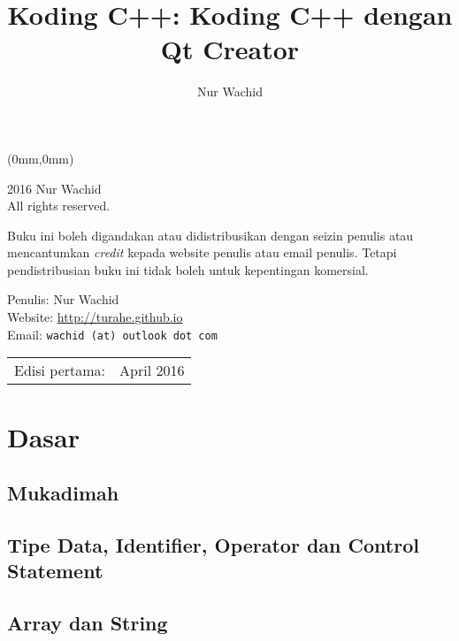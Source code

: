 \documentclass[11pt,b5paper,oneside,titlepage]{book}
\makeatletter
\renewcommand{\cleardoublepage}{
	\clearpage\ifodd\c@page\else
	\hbox{}
	\vspace*{\fill}
	\thispagestyle{empty}
	\newpage
	\fi}
\makeatother
\begin{document}
	\begin{textblock*}{297mm}(0mm,0mm)
	\end{textblock*}
	\cleardoublepage
	\frontmatter
	\author{Nur Wachid}
	\title{Koding C++: Koding C++ dengan Qt Creator}
	\maketitle
	\begingroup
	\parskip \baselineskip
	
	
	\textcopyright{} 2016 Nur Wachid \\
	All rights reserved.
	
	Buku ini boleh digandakan atau didistribusikan dengan
	seizin penulis atau mencantumkan \emph{credit} kepada
	website penulis atau email penulis. Tetapi pendistribusian
	buku ini tidak boleh untuk kepentingan komersial.
	
	Penulis: Nur Wachid \\
	Website: \url{http://turahe.github.io}  \\
	Email: \texttt{wachid  (at) outlook dot com} \\
	\phone 
	
	\begin{center}
		\begin{tabular}{ll}
			Edisi pertama:  & April 2016 \\
		\end{tabular}
	\end{center}
	
	\endgroup
	\tableofcontents
	\newpage
	
	\mainmatter
	
	\part{Dasar}
	\chapter{Mukadimah}\label{mukadimah}
	
	
	\chapter{Tipe Data, Identifier, Operator dan Control Statement}\label{tipe-data-identifier-operator-dan-control-statement}
	
	
	\chapter{Array dan String}\label{array-dan-string}
	
	
\end{document}
